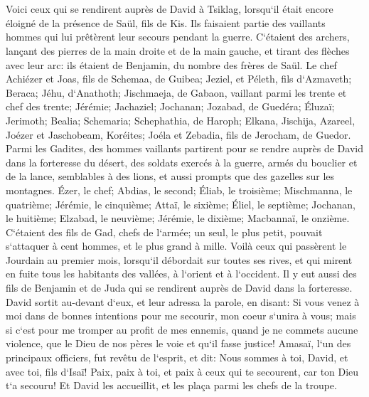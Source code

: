 \chapter{}

\verse Voici ceux qui se rendirent auprès de David à Tsiklag, lorsqu`il était encore éloigné de la présence de Saül, fils de Kis. Ils faisaient partie des vaillants hommes qui lui prêtèrent leur secours pendant la guerre. 
\verse C`étaient des archers, lançant des pierres de la main droite et de la main gauche, et tirant des flèches avec leur arc: ils étaient de Benjamin, du nombre des frères de Saül. 
\verse Le chef Achiézer et Joas, fils de Schemaa, de Guibea; Jeziel, et Péleth, fils d`Azmaveth; Beraca; Jéhu, d`Anathoth; 
\verse Jischmaeja, de Gabaon, vaillant parmi les trente et chef des trente; Jérémie; Jachaziel; Jochanan; Jozabad, de Guedéra; 
\verse Éluzaï; Jerimoth; Bealia; Schemaria; Schephathia, de Haroph; 
\verse Elkana, Jischija, Azareel, Joézer et Jaschobeam, Koréites; 
\verse Joéla et Zebadia, fils de Jerocham, de Guedor. 
\verse Parmi les Gadites, des hommes vaillants partirent pour se rendre auprès de David dans la forteresse du désert, des soldats exercés à la guerre, armés du bouclier et de la lance, semblables à des lions, et aussi prompts que des gazelles sur les montagnes. 
\verse Ézer, le chef; Abdias, le second; Éliab, le troisième; 
\verse Mischmanna, le quatrième; Jérémie, le cinquième; 
\verse Attaï, le sixième; Éliel, le septième; 
\verse Jochanan, le huitième; Elzabad, le neuvième; 
\verse Jérémie, le dixième; Macbannaï, le onzième. 
\verse C`étaient des fils de Gad, chefs de l`armée; un seul, le plus petit, pouvait s`attaquer à cent hommes, et le plus grand à mille. 
\verse Voilà ceux qui passèrent le Jourdain au premier mois, lorsqu`il débordait sur toutes ses rives, et qui mirent en fuite tous les habitants des vallées, à l`orient et à l`occident. 
\verse Il y eut aussi des fils de Benjamin et de Juda qui se rendirent auprès de David dans la forteresse. 
\verse David sortit au-devant d`eux, et leur adressa la parole, en disant: Si vous venez à moi dans de bonnes intentions pour me secourir, mon coeur s`unira à vous; mais si c`est pour me tromper au profit de mes ennemis, quand je ne commets aucune violence, que le Dieu de nos pères le voie et qu`il fasse justice! 
\verse Amasaï, l`un des principaux officiers, fut revêtu de l`esprit, et dit: Nous sommes à toi, David, et avec toi, fils d`Isaï! Paix, paix à toi, et paix à ceux qui te secourent, car ton Dieu t`a secouru! Et David les accueillit, et les plaça parmi les chefs de la troupe. 
